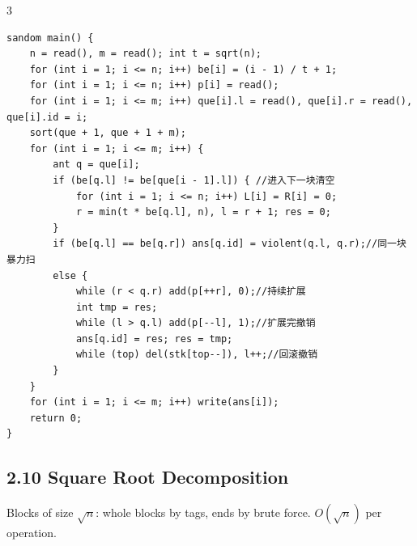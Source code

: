 \documentclass[8pt]{extarticle}
\begin{document}
\begin{multicols*}{3}
\begin{lstlisting}
sandom main() {
    n = read(), m = read(); int t = sqrt(n);
    for (int i = 1; i <= n; i++) be[i] = (i - 1) / t + 1;
    for (int i = 1; i <= n; i++) p[i] = read();
    for (int i = 1; i <= m; i++) que[i].l = read(), que[i].r = read(), que[i].id = i;
    sort(que + 1, que + 1 + m);
    for (int i = 1; i <= m; i++) {
        ant q = que[i];
        if (be[q.l] != be[que[i - 1].l]) { //进入下一块清空
            for (int i = 1; i <= n; i++) L[i] = R[i] = 0;
            r = min(t * be[q.l], n), l = r + 1; res = 0;
        }
        if (be[q.l] == be[q.r]) ans[q.id] = violent(q.l, q.r);//同一块暴力扫
        else {
            while (r < q.r) add(p[++r], 0);//持续扩展
            int tmp = res;
            while (l > q.l) add(p[--l], 1);//扩展完撤销
            ans[q.id] = res; res = tmp;
            while (top) del(stk[top--]), l++;//回滚撤销
        }
    }
    for (int i = 1; i <= m; i++) write(ans[i]);
    return 0;
}
\end{lstlisting}

\subsection*{2.10 Square Root Decomposition}

Blocks of size $\sqrt n$: whole blocks by tags, ends by brute force. $O(\sqrt n)$ per operation.



\end{multicols*}
\end{document}
